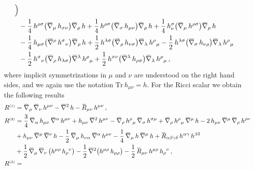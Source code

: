 \documentclass[11pt]{book}
\newcommand{\overbar}[1]{\mkern 1.5mu\overline{\mkern-1.5mu#1\mkern-1.5mu}\mkern 1.5mu}
\newcommand{\bnabla}{\overbar \nabla}
\newcommand{\bR}{\overbar R}
\newcommand{\Tr}{\mathrm{Tr}}
\numberwithin{equation}{chapter}
\begin{document}
\begin{appendices}
\begin{align}
    \Big) \nonumber \\
  & - \frac{1}{4} \, h^{\rho\sigma}   \big( \bnabla_{\mu}    \, h_{\sigma \nu}   \big) \bnabla_{\rho} \, h
    + \frac{1}{4} \, h^{\rho \sigma}  \big( \bnabla_{\sigma} \, h_{\mu \nu}      \big) \bnabla_{\rho} \, h
    + \frac{1}{4} \, h^{\sigma}_{\nu} \big( \bnabla_{\mu}    \, h^{\rho \sigma}  \big) \bnabla_{\rho} \, h
    \nonumber \\
  & - \frac{1}{4} \, h_{\mu \sigma}     \big( \bnabla^{\rho}   \, h^{\sigma}{}_{\nu} \big) \bnabla_{\rho}    \, h
    + \frac{1}{2} \, h^{\lambda \sigma} \big( \bnabla_{\rho}   \, h_{\nu \sigma}     \big) \bnabla_{\lambda} \, h^{\rho}{}_{\mu}
    - \frac{1}{2} \, h^{\lambda \sigma} \big( \bnabla_{\sigma} \, h_{\nu \rho}       \big) \bnabla_{\lambda} \, h^{\rho}{}_{\mu} \nonumber \\
  & \vphantom{\frac{1}{2}}
    - \frac{1}{2} \, h^{\sigma}{}_{\nu} \big( \bnabla_{\rho}    \, h_{\lambda \sigma} \big) \bnabla^{\lambda} \, h^{\rho}{}_{\mu}
    + \frac{1}{2} \, h^{\sigma \nu}     \big( \bnabla^{\lambda} \, h_{\rho \sigma}    \big) \bnabla_{\lambda} \, h^{\rho}{}_{\mu} \,,
\end{align}
where implicit symmetrizations in $\mu$ and $\nu$ are understood on the right hand sides,
and we again use the notation $\Tr \, h_{\mu\nu} = h$. For the Ricci scalar we obtain the
following results
\begin{align}
  R^{\scriptscriptstyle(1)} &=
  \bnabla_\mu \, \bnabla_\nu  \, h^{\mu\nu}
  - \bnabla^2 \, h
  - \bR_{\mu\nu} \, h^{\mu\nu} \,, \\
  R^{\scriptscriptstyle(2)} &=
  \frac34 \, \bnabla_\alpha \, h_{\mu\nu} \, \bnabla^\alpha \, h^{\mu\nu}
  + h_{\mu\nu} \, \bnabla^2 \, h^{\mu\nu}
  - \bnabla_\rho \, h^\rho{}_\mu \, \bnabla_\sigma \, h^{\sigma\mu}
  + \bnabla_\rho \, h^\rho{}_\mu \, \bnabla^\mu \, h
  - 2 \, h_{\mu\nu} \, \bnabla^\mu \, \bnabla_\rho \, h^{\rho\nu} \nonumber \\
  &
  + h_{\mu\nu} \, \bnabla^\mu \, \bnabla^\nu \, h
  - \frac12 \, \bnabla_\mu \, h_{\nu\alpha} \, \bnabla^\alpha \, h^{\mu\nu}
  - \frac14 \, \bnabla_\mu \, h \, \bnabla^\mu \, h
  + \bR_{\alpha\beta\gamma\delta} \, h^{\alpha\gamma} \, h^{\beta\delta} \nonumber \\
  &
  + \frac{1}{2} \, \bnabla_\mu \, \bnabla_\nu \, \big( h^{\mu\rho} \, h_\rho{}^\nu \big)
  - \frac{1}{2} \, \bnabla^2 \big( h^{\mu\rho} \, h_{\mu\rho} \big)
  - \frac{1}{2} \, \bR_{\mu\nu} \, h^{\mu\rho} \, h_\rho{}^\nu \,, \\
  R^{\scriptscriptstyle(3)} &=

\end{align}
\end{appendices}
\end{document}
